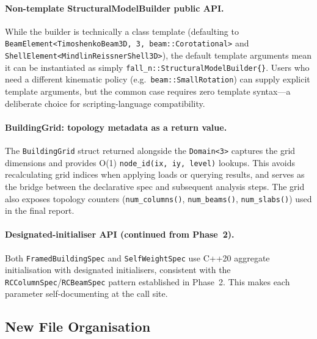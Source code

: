 \paragraph{Non-template StructuralModelBuilder public API.}
While the builder is technically a class template (defaulting to
\texttt{BeamElement<TimoshenkoBeam3D, 3, beam::Corotational>} and
\texttt{ShellElement<MindlinReissnerShell3D>}), the default template
arguments mean it can be instantiated as simply
\texttt{fall\_n::StructuralModelBuilder\{\}}.  Users who need a
different kinematic policy (e.g.\ \texttt{beam::SmallRotation}) can
supply explicit template arguments, but the common case requires zero
template syntax---a deliberate choice for scripting-language
compatibility.

\paragraph{BuildingGrid: topology metadata as a return value.}
The \texttt{BuildingGrid} struct returned alongside the
\texttt{Domain<3>} captures the grid dimensions and provides O(1)
\texttt{node\_id(ix, iy, level)} lookups.  This avoids recalculating
grid indices when applying loads or querying results, and serves as
the bridge between the declarative spec and subsequent analysis steps.
The grid also exposes topology counters
(\texttt{num\_columns()}, \texttt{num\_beams()}, \texttt{num\_slabs()})
used in the final report.

\paragraph{Designated-initialiser API (continued from Phase~2).}
Both \texttt{FramedBuildingSpec} and \texttt{SelfWeightSpec} use C++20
aggregate initialisation with designated initialisers, consistent with
the \texttt{RCColumnSpec}/\texttt{RCBeamSpec} pattern established in
Phase~2.  This makes each parameter self-documenting at the call site.

\subsection{New File Organisation}
\label{sec:phase3-files}

